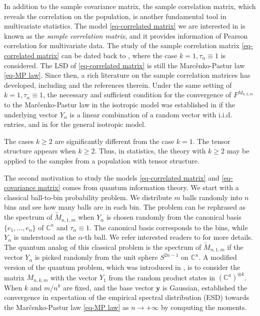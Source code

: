 \documentclass[12pt]{article}
\numberwithin{equation}{section} \theoremstyle{plain}
\def\bC{\mathbb C}
\def\y{\mathbf y}
\begin{document}
In addition to the sample covariance matrix, the sample correlation matrix, which reveals the correlation on the population, is another fundamental tool in multivariate statistics.
The model \eqref{eq-correlated matrix} we are interested in is known as the \emph{sample correlation matrix}, and it provides information of Pearson
correlation for multivariate data.
The study of the sample correlation matrix \eqref{eq-correlated matrix} can be dated back to \cite{Jiang2004}, where the case $k=1, \tau_\alpha \equiv 1$ is considered. The LSD of \eqref{eq-correlated matrix} is still the Marc\v{e}nko-Pastur law \eqref{eq-MP law}.
Since then, a rich literature on the sample correlation matrices has developed, including \cites{GHPY2017,Ding2020,YLTZ2022,YZZ2023,HY2022,BHXZ2024} and the references therein.
Under the same setting of $k=1, \tau_\alpha \equiv 1$, the necessary and sufficient condition for the convergence of $F^{M_{n,k,m}}$ to the Mar\v{c}enko-Pastur law in the isotropic model was established in \cite{DH2025} if the underlying vector $Y_\alpha$ is a linear combination of a random vector with i.i.d. entries, and in \cite{DongYao2025} for the general isotropic model.

The cases $k \ge 2$ are significantly different from the case $k=1$. The tensor structure appears when $k \ge 2$. Thus, in statistics, the theory with $k \ge 2$ may be applied to the samples from a population with tensor structure.

The second motivation to study the models \eqref{eq-correlated matrix} and \eqref{eq-covariance matrix} comes from quantum information theory.
We start with a classical ball-to-bin probability problem.
We distribute $m$ balls randomly into $n$ bins and see how many balls are in each bin. The problem can be rephrased as the spectrum of $\widetilde M_{n,1,m}$ when $Y_\alpha$ is chosen randomly from the canonical basis $\{e_1, \ldots, e_n\}$ of $\bC^n$ and $\tau_\alpha \equiv 1$.
The canonical basis corresponds to the bins, while $Y_\alpha$ is understood as the $\alpha$-th ball.
We refer interested readers to \cite{Yuan2024} for more details.
The quantum analog of this classical problem is the spectrum of $\widetilde M_{n,1,m}$ if the vector $Y_\alpha$ is picked randomly from the unit sphere $S^{2n-1}$ on $\bC^n$.
A modified version of the quantum problem, which was introduced in \cite{Hastings2012}, is to consider the matrix $M_{n,k,m}$ with the vector $Y_1$ from the random product states in $(\bC^n)^{\otimes k}$. When $k$ and $m/n^k$ are fixed, and the base vector $\y$ is Gaussian, \cite{Hastings2012} established the convergence in expectation of the empirical spectral distribution (ESD) towards the Mar\v{c}enko-Pastur law \eqref{eq-MP law} as $n \to +\infty$ by computing the moments.
\end{document}
